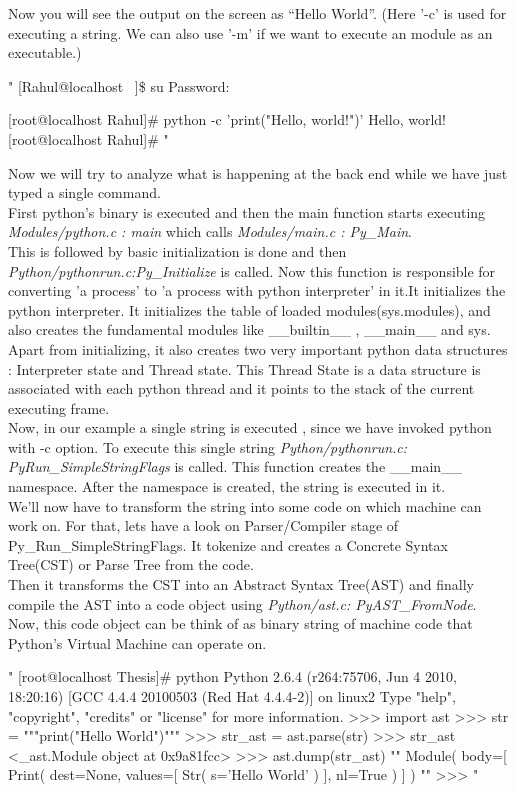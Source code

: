 Now you will see the output on the screen as “Hello World”.
(Here '-c' is used for executing a string. We can also use '-m' if we want to execute an module as an executable.)
\begin{code}
"
[Rahul@localhost ~]\$ su
Password: 

[root@localhost Rahul]# python -c 'print("Hello, world!")'
Hello, world!
[root@localhost Rahul]# 
"
\end{code}
Now we will try to analyze what is happening at the back end while we have just typed a single command. 
\\
First python's binary is executed and then the main function starts executing \textit{Modules/python.c : main} which calls \textit{Modules/main.c : Py\_Main}. 
\\
This is followed by basic initialization is done and then \textit{Python/pythonrun.c:Py\_Initialize} is called. Now this function is responsible for converting 'a process' to 'a process with python interpreter' in it.It initializes the python interpreter. It initializes the table of loaded modules(sys.modules), and also creates the fundamental modules like \_\_builtin\_\_ , \_\_main\_\_ and sys. Apart from initializing, it  also creates two very important python data structures : Interpreter state and Thread state.  This Thread State is a data structure is associated with each python thread and it points to the stack of the current executing frame.
\\
Now, in our example a single string is executed , since we have invoked python with -c option. To execute this single string \textit{Python/pythonrun.c: PyRun\_SimpleStringFlags} is called. This function creates the \_\_main\_\_ namespace. After the namespace is created, the string is executed in it. 
\\
We'll now have to transform the string into some code on which machine can work on. For that, lets have a look on Parser/Compiler stage of Py\_Run\_SimpleStringFlags. It tokenize and creates a Concrete Syntax Tree(CST) or Parse Tree  from the code. 
\\
Then it transforms the CST into an Abstract Syntax Tree(AST) and finally compile the AST into a code object using \textit{Python/ast.c: PyAST\_FromNode}. Now, this code object can be think of as  binary string of machine code that Python's Virtual Machine can operate on.
\begin{code}
"
[root@localhost Thesis]# python
Python 2.6.4 (r264:75706, Jun  4 2010, 18:20:16) 
[GCC 4.4.4 20100503 (Red Hat 4.4.4-2)] on linux2
Type "help", "copyright", "credits" or "license" for more information.
>>> import ast
>>> str = """print("Hello World")"""
>>> str_ast = ast.parse(str)
>>> str_ast
<_ast.Module object at 0x9a81fcc>
>>> ast.dump(str_ast)
""
Module(
	body=[
		Print(
			dest=None, 
			values=[
				Str(
					s='Hello World'
				   )
			       ], 
			nl=True
		     )
	     ]
       )
""
>>> 
"
\end{code}
